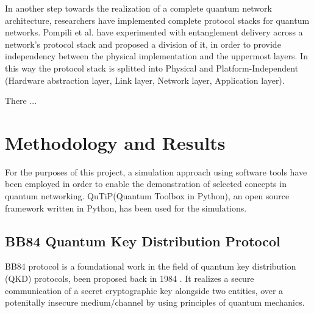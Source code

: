 \documentclass[12pt,a4paper] {report}
\begin{document}
		In another step towards the realization of a complete quantum network architecture,
		researchers have implemented complete protocol stacks for quantum networks.
		Pompili et al. \cite{pompilli} have experimented with entanglement delivery across 
		a network's protocol stack and proposed a division of it, in order to provide 
		independency between the physical implementation and the uppermost layers. 
		In this way the protocol stack is splitted into Physical and Platform-Independent
		(Hardware abstraction layer, Link layer, Network layer, Application layer).


		There ...  \cite{powergrid}







	\chapter{Methodology and Results}
		
		For the purposes of this project, a
		simulation approach using software tools
		have been employed in order to enable the
		demonstration of selected concepts in quantum networking.
		QuTiP(Quantum Toolbox in Python)\cite{qutip}, an open source framework
		written in Python, has been used for the simulations.

		\section{BB84 Quantum Key Distribution Protocol}

		BB84 protocol is a foundational work in the field
		of quantum key distribution (QKD) protocols,
		been proposed back in 1984 \cite{bb84}.
		It realizes a secure communication of a secret cryptographic key
		alongside two entities, over a potenitally insecure medium/channel
		by using principles of quantum mechanics.
		
\end{document}
